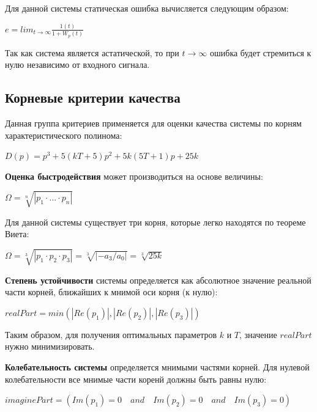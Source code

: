 \documentclass[14pt,a4paper,report]{report}
\begin{document}
Для данной системы статическая ошибка вычисляется следующим образом:

\begin{center}
	$e=lim_{t\rightarrow\infty}\frac{1(t)}{1+W_p(t)}$
\end{center}

Так как система является астатической, то при $t\rightarrow\infty$ ошибка будет стремиться к нулю независимо от входного сигнала.

\subsection{Корневые критерии качества}

Данная группа критериев применяется для оценки качества системы по корням характеристического полинома:

\begin{center}
$D(p)=p^3+5(kT+5)p^2+5k(5T+1)p+25k$
\end{center}

\textbf{Оценка быстродействия} может производиться на основе величины:

\begin{center}
$\Omega=\sqrt[n]{|p_1\cdot...\cdot p_n|}$
\end{center}

Для данной системы существует три корня, которые легко находятся по теореме Виета:

\begin{center}
$\Omega=\sqrt[3]{|p_1\cdot p_2\cdot p_3|}=\sqrt[3]{|-a_3/a_0|}=\sqrt[3]{25k}$
\end{center}

\textbf{Степень устойчивости} системы определяется как абсолютное значение реальной части корней, ближайших к мнимой оси корня (к нулю):

\begin{center}
$realPart = min(|Re(p_1)|, |Re(p_2)|, |Re(p_3)|)$
\end{center}

Таким образом, для получения оптимальных параметров $k$ и $T$, значение $realPart$ нужно минимизировать.

\textbf{Колебательность системы} определяется мнимыми частями корней. Для нулевой колебательности все мнимые части коренй должны быть равны нулю:

\begin{center}
$imaginePart = (Im(p_1)=0\quad and\quad Im(p_2)=0\quad and\quad Im(p_3)=0)$
\end{center}
\end{document}
